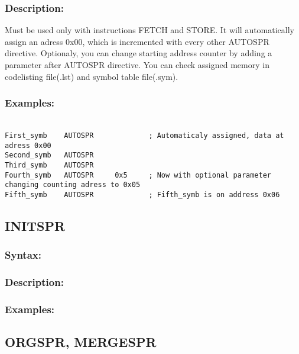     \subsubsection{Description:}
    Must be used only with instructions FETCH and STORE. It will automatically assign an
    adress 0x00, which is incremented with every other AUTOSPR directive. Optionaly, you can change starting address counter by adding a parameter
    after AUTOSPR directive. You can check assigned memory in codelisting file(.lst) and symbol table file(.sym).

    \subsubsection{Examples:}
        {
            ~\\
            \usecodefont
            \verb'First_symb    AUTOSPR             ; Automaticaly assigned, data at adress 0x00'\\
            \verb'Second_symb   AUTOSPR'\\
            \verb'Third_symb    AUTOSPR'\\
            \verb'Fourth_symb   AUTOSPR     0x5     ; Now with optional parameter changing counting adress to 0x05'\\
            \verb'Fifth_symb    AUTOSPR             ; Fifth_symb is on address 0x06'\\
        }
            
    \subsection{INITSPR}
        \subsubsection{Syntax:}

        \subsubsection{Description:}
 
        \subsubsection{Examples:}


    \subsection{ORGSPR, MERGESPR}
